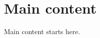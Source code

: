 \documentclass{article}
\begin{document}
\section{Main content}
Main content starts here.
\end{document}
